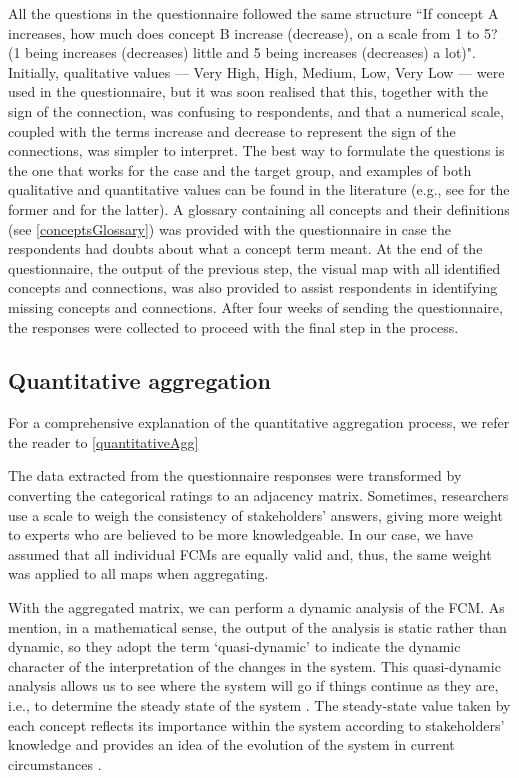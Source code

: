 All the questions in the questionnaire followed the same structure ``If concept A increases, how much does concept B increase (decrease), on a scale from 1 to 5? (1 being increases (decreases) little and 5 being increases (decreases) a lot)". Initially, qualitative values --- Very High, High, Medium, Low, Very Low --- were used in the questionnaire, but it was soon realised that this, together with the sign of the connection, was confusing to respondents, and that a numerical scale, coupled with the terms increase and decrease to represent the sign of the connections, was simpler to interpret. The best way to formulate the questions is the one that works for the case and the target group, and examples of both qualitative and quantitative values can be found in the literature (e.g., see \cite{morone2021using} for the former and \cite{olazabal2016use} for the latter). A glossary containing all concepts and their definitions (see \cref{conceptsGlossary}) was provided with the questionnaire in case the respondents had doubts about what a concept term meant. At the end of the questionnaire, the output of the previous step, the visual map with all identified concepts and connections, was also provided to assist respondents in identifying missing concepts and connections. After four weeks of sending the questionnaire, the responses were collected to proceed with the final step in the process. 

\subsection{Quantitative aggregation}

For a comprehensive explanation of the quantitative aggregation process, we refer the reader to \cref{quantitativeAgg}

The data extracted from the questionnaire responses were transformed by converting the categorical ratings to an adjacency matrix. Sometimes, researchers use a scale to weigh the consistency of stakeholders' answers, giving more weight to experts who are believed to be more knowledgeable. In our case, we have assumed that all individual FCMs are equally valid and, thus, the same weight was applied to all maps when aggregating. 

With the aggregated matrix, we can perform a dynamic analysis of the FCM. As \cite{edwards2021building} mention, in a mathematical sense, the output of the analysis is static rather than dynamic, so they adopt the term ‘quasi-dynamic’ to indicate the dynamic character of the interpretation of the changes in the system. This quasi-dynamic analysis allows us to see where the system will go if things continue as they are, i.e., to determine the steady state of the system \citep{ozesmi2004ecological}. The steady-state value taken by each concept reflects its importance within the system according to stakeholders' knowledge and provides an idea of the evolution of the system in current circumstances \citep{lopolito2020combined}. 

